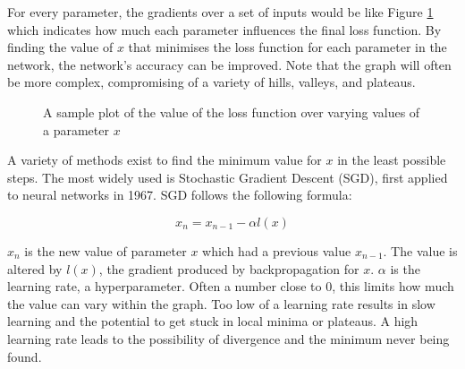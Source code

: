 For every parameter, the gradients over a set of inputs would be like Figure \ref{fig:loss-graph} which indicates how much each parameter influences the final loss function. By finding the value of $x$ that minimises the loss function for each parameter in the network, the network's accuracy can be improved. Note that the graph will often be more complex, compromising of a variety of hills, valleys, and plateaus.

\begin{figure}[H]
    \centering
    \caption{A sample plot of the value of the loss function over varying values of a parameter $x$}
    \label{fig:loss-graph}
\end{figure}

A variety of methods exist to find the minimum value for $x$ in the least possible steps. The most widely used is Stochastic Gradient Descent (SGD)\cite{robbins1951stochastic}, first applied to neural networks in 1967\cite{shunichi1967theory}. SGD follows the following formula:

\begin{equation}
    x_n=x_{n-1}-\alpha l(x)
\end{equation}

$x_n$ is the new value of parameter $x$ which had a previous value $x_{n-1}$. The value is altered by $l(x)$, the gradient produced by backpropagation for $x$. $\alpha$ is the learning rate, a hyperparameter. Often a number close to 0, this limits how much the value can vary within the graph. Too low of a learning rate results in slow learning and the potential to get stuck in local minima or plateaus. A high learning rate leads to the possibility of divergence and the minimum never being found.


